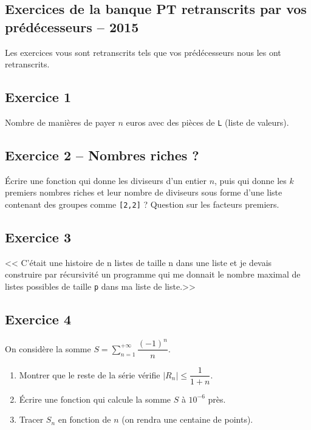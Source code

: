 \documentclass[10pt,fleqn]{article} %
\begin{document}
\newpage 
\begin{multicols}{2}
\section{Exercices de la banque PT retranscrits par vos prédécesseurs -- 2015}
\begin{rem}
Les exercices vous sont retranscrits tels que vos prédécesseurs nous les ont retranscrits. 
\end{rem}
\subsection*{Exercice 1}
Nombre de manières de payer $n$ euros avec des pièces de \texttt{L} (liste de valeurs).  

\subsection*{Exercice 2 -- Nombres riches ?}
Écrire une fonction qui donne les diviseurs d'un entier $n$, puis qui donne les $k$ premiers nombres riches et leur nombre de diviseurs sous forme d'une liste contenant des groupes comme \texttt{[2,2]} ? Question sur les facteurs premiers.

\subsection*{Exercice 3}
<< C'était une histoire de n listes de taille n dans une liste et je devais construire par récursivité un programme qui me donnait le nombre maximal de listes possibles de taille \texttt{p} dans ma liste de liste.>>


\subsection*{Exercice 4}
On considère la somme $S=\sum\limits_{n=1}^{+\infty} \dfrac{(-1)^n}{n}$.
\begin{enumerate}
\item Montrer que le reste de la série vérifie $\left| R_n \right| \leq \dfrac{1}{1+n}$.
\item Écrire une fonction qui calcule la somme $S$ à $10^{-6}$ près.
\item Tracer $S_n$ en fonction de $n$ (on rendra une centaine de points).
\end{enumerate}


\end{multicols}
\end{document}
